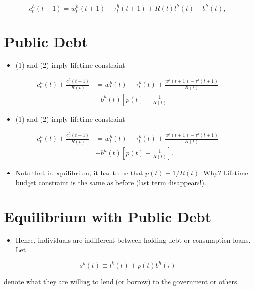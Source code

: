 \documentclass[10pt]{article}
\begin{document}
\begin{equation*}
c_{t}^{h}(t+1)=w_{t}^{h}(t+1)-\tau_{t}^{h}(t+1)+R(t) l^{h}(t)+b^{h}(t), \tag{2}
\end{equation*}


\section*{Public Debt}
\begin{itemize}
  \item (1) and (2) imply lifetime constraint
\end{itemize}

$$
\begin{aligned}
c_{t}^{h}(t)+\frac{c_{t}^{h}(t+1)}{R(t)} & =w_{t}^{h}(t)-\tau_{t}^{h}(t)+\frac{w_{t}^{h}(t+1)-\tau_{t}^{h}(t+1)}{R(t)} \\
& -b^{h}(t)\left[p(t)-\frac{1}{R(t)}\right]
\end{aligned}
$$

\begin{itemize}
  \item (1) and (2) imply lifetime constraint
\end{itemize}

$$
\begin{aligned}
c_{t}^{h}(t)+\frac{c_{t}^{h}(t+1)}{R(t)} & =w_{t}^{h}(t)-\tau_{t}^{h}(t)+\frac{w_{t}^{h}(t+1)-\tau_{t}^{h}(t+1)}{R(t)} \\
& -b^{h}(t)\left[p(t)-\frac{1}{R(t)}\right] .
\end{aligned}
$$

\begin{itemize}
  \item Note that in equilibrium, it has to be that $p(t)=1 / R(t)$. Why? Lifetime budget constraint is the same as before (last term disappears!).
\end{itemize}

\section*{Equilibrium with Public Debt}
\begin{itemize}
  \item Hence, individuals are indifferent between holding debt or consumption loans. Let
\end{itemize}

$$
s^{h}(t) \equiv l^{h}(t)+p(t) b^{h}(t)
$$

denote what they are willing to lend (or borrow) to the government or others.
\end{document}

